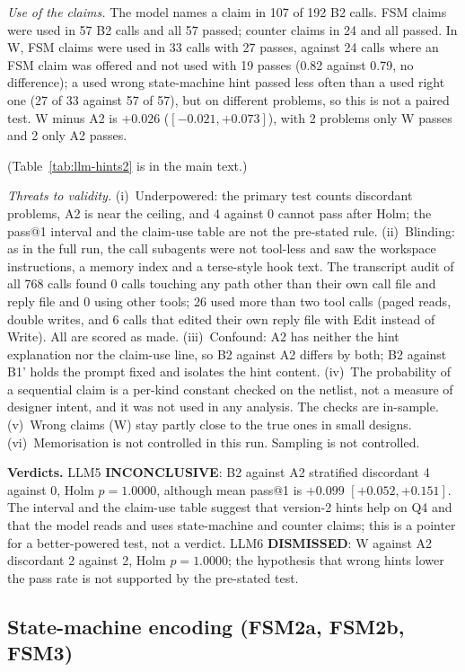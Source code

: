 \documentclass[conference]{IEEEtran}
\newcommand{\verdict}[1]{\textbf{\textsc{#1}}}
\newcommand{\hev}[1]{\par\smallskip\noindent\textbf{#1}}
\begin{document}
\emph{Use of the claims.} The model names a claim in 107 of 192 B2 calls. FSM claims were used in 57 B2 calls and all 57
passed; counter claims in 24 and all passed. In W, FSM claims were used in 33 calls with 27 passes, against 24 calls where
an FSM claim was offered and not used with 19 passes (0.82 against 0.79, no difference); a used wrong state-machine hint passed
less often than a used right one (27 of 33 against 57 of 57), but on different problems, so this is not a paired test. W minus
A2 is $+0.026$ ($[-0.021,+0.073]$), with 2 problems only W passes and 2 only A2 passes.

(Table~\ref{tab:llm-hints2} is in the main text.)

\emph{Threats to validity.} (i)~Underpowered: the primary test counts discordant problems, A2 is near the ceiling, and 4
against 0 cannot pass after Holm; the pass@1 interval and the claim-use table are not the pre-stated rule. (ii)~Blinding: as in
the full run, the call subagents were not tool-less and saw the workspace instructions, a memory index and a terse-style hook text.
The transcript audit of all 768 calls found 0 calls touching any path other than their own call file and reply file and 0 using other
tools; 26 used more than two tool calls (paged reads, double writes, and 6 calls that edited their own reply file with Edit instead
of Write). All are scored as made. (iii)~Confound: A2 has neither the hint explanation nor the claim-use line, so B2 against A2 differs by
both; B2 against B1' holds the prompt fixed and isolates the hint content. (iv)~The probability of a sequential claim is a per-kind
constant checked on the netlist, not a measure of designer intent, and it was not used in any analysis. The checks are in-sample.
(v)~Wrong claims (W) stay partly close to the true ones in small designs. (vi)~Memorisation is not controlled in this run. Sampling is
not controlled.

\hev{Verdicts.} LLM5 \verdict{INCONCLUSIVE}: B2 against A2 stratified discordant 4 against 0, Holm $p=1.0000$, although mean pass@1
is $+0.099$ $[+0.052,+0.151]$. The interval and the claim-use table suggest that version-2 hints help on Q4 and that the model reads
and uses state-machine and counter claims; this is a pointer for a better-powered test, not a verdict. LLM6 \verdict{DISMISSED}: W against
A2 discordant 2 against 2, Holm $p=1.0000$; the hypothesis that wrong hints lower the pass rate is not supported by the pre-stated test.

\subsection{State-machine encoding (FSM2a, FSM2b, FSM3)}
\label{rec:fsm}
\end{document}
